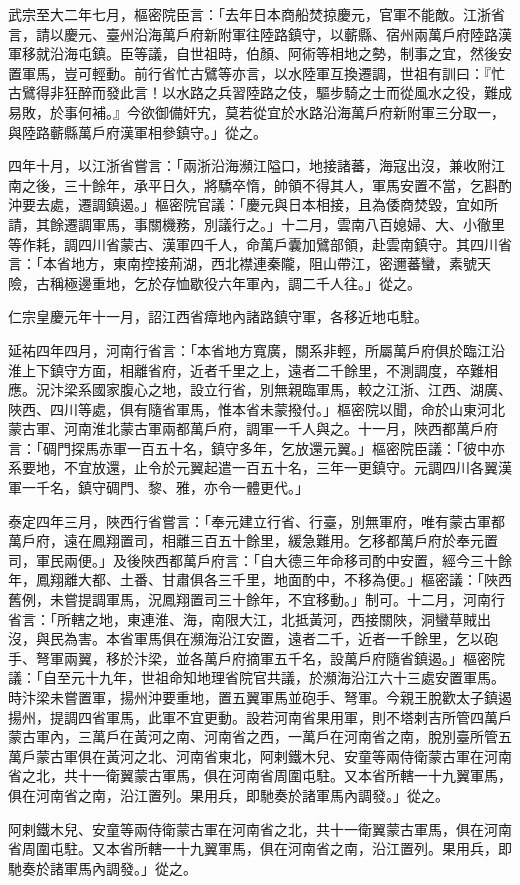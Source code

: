 \begin{pinyinscope}
 武宗至大二年七月，樞密院臣言：「去年日本商船焚掠慶元，官軍不能敵。江浙省言，請以慶元、臺州沿海萬戶府新附軍往陸路鎮守，以蘄縣、宿州兩萬戶府陸路漢軍移就沿海屯鎮。臣等議，自世祖時，伯顏、阿術等相地之勢，制事之宜，然後安置軍馬，豈可輕動。前行省忙古鷿等亦言，以水陸軍互換遷調，世祖有訓曰：『忙古鷿得非狂醉而發此言！以水路之兵習陸路之伎，驅步騎之士而從風水之役，難成易敗，於事何補。』今欲御備奸宄，莫若從宜於水路沿海萬戶府新附軍三分取一，與陸路蘄縣萬戶府漢軍相參鎮守。」從之。



 四年十月，以江浙省嘗言：「兩浙沿海瀕江隘口，地接諸蕃，海寇出沒，兼收附江南之後，三十餘年，承平日久，將驕卒惰，帥領不得其人，軍馬安置不當，乞斟酌沖要去處，遷調鎮遏。」樞密院官議：「慶元與日本相接，且為倭商焚毀，宜如所請，其餘遷調軍馬，事關機務，別議行之。」十二月，雲南八百媳婦、大、小徹里等作耗，調四川省蒙古、漢軍四千人，命萬戶囊加鷿部領，赴雲南鎮守。其四川省言：「本省地方，東南控接荊湖，西北襟連秦隴，阻山帶江，密邇蕃蠻，素號天險，古稱極邊重地，乞於存恤歇役六年軍內，調二千人往。」從之。



 仁宗皇慶元年十一月，詔江西省瘴地內諸路鎮守軍，各移近地屯駐。



 延祐四年四月，河南行省言：「本省地方寬廣，關系非輕，所屬萬戶府俱於臨江沿淮上下鎮守方面，相離省府，近者千里之上，遠者二千餘里，不測調度，卒難相應。況汴梁系國家腹心之地，設立行省，別無親臨軍馬，較之江浙、江西、湖廣、陜西、四川等處，俱有隨省軍馬，惟本省未蒙撥付。」樞密院以聞，命於山東河北蒙古軍、河南淮北蒙古軍兩都萬戶府，調軍一千人與之。十一月，陜西都萬戶府言：「碉門探馬赤軍一百五十名，鎮守多年，乞放還元翼。」樞密院臣議：「彼中亦系要地，不宜放還，止令於元翼起遣一百五十名，三年一更鎮守。元調四川各翼漢軍一千名，鎮守碉門、黎、雅，亦令一體更代。」



 泰定四年三月，陜西行省嘗言：「奉元建立行省、行臺，別無軍府，唯有蒙古軍都萬戶府，遠在鳳翔置司，相離三百五十餘里，緩急難用。乞移都萬戶府於奉元置司，軍民兩便。」及後陜西都萬戶府言：「自大德三年命移司酌中安置，經今三十餘年，鳳翔離大都、土番、甘肅俱各三千里，地面酌中，不移為便。」樞密議：「陜西舊例，未嘗提調軍馬，況鳳翔置司三十餘年，不宜移動。」制可。十二月，河南行省言：「所轄之地，東連淮、海，南限大江，北抵黃河，西接關陜，洞蠻草賊出沒，與民為害。本省軍馬俱在瀕海沿江安置，遠者二千，近者一千餘里，乞以砲手、弩軍兩翼，移於汴梁，並各萬戶府摘軍五千名，設萬戶府隨省鎮遏。」樞密院議：「自至元十九年，世祖命知地理省院官共議，於瀕海沿江六十三處安置軍馬。時汴梁未嘗置軍，揚州沖要重地，置五翼軍馬並砲手、弩軍。今親王脫歡太子鎮遏揚州，提調四省軍馬，此軍不宜更動。設若河南省果用軍，則不塔剌吉所管四萬戶蒙古軍內，三萬戶在黃河之南、河南省之西，一萬戶在河南省之南，脫別臺所管五萬戶蒙古軍俱在黃河之北、河南省東北，阿剌鐵木兒、安童等兩侍衛蒙古軍在河南省之北，共十一衛翼蒙古軍馬，俱在河南省周圍屯駐。又本省所轄一十九翼軍馬，俱在河南省之南，沿江置列。果用兵，即馳奏於諸軍馬內調發。」從之。



 阿剌鐵木兒、安童等兩侍衛蒙古軍在河南省之北，共十一衛翼蒙古軍馬，俱在河南省周圍屯駐。又本省所轄一十九翼軍馬，俱在河南省之南，沿江置列。果用兵，即馳奏於諸軍馬內調發。」從之。



\end{pinyinscope}